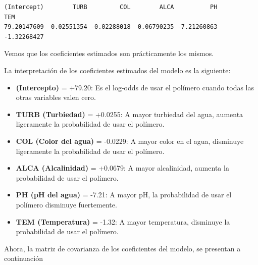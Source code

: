 \documentclass[
  letterpaper,
  DIV=11,
  numbers=noendperiod]{scrartcl}
\newenvironment{Shaded}{\begin{snugshade}}{\end{snugshade}}
\newcommand{\FunctionTok}[1]{\textcolor[rgb]{0.28,0.35,0.67}{#1}}
\newcommand{\NormalTok}[1]{\textcolor[rgb]{0.00,0.23,0.31}{#1}}
\newcommand{\SpecialCharTok}[1]{\textcolor[rgb]{0.37,0.37,0.37}{#1}}
\providecommand{\tightlist}{%
  \setlength{\itemsep}{0pt}\setlength{\parskip}{0pt}}\usepackage{longtable,booktabs,array}
\begin{document}
\begin{verbatim}
(Intercept)        TURB         COL        ALCA          PH         TEM 
79.20147609  0.02551354 -0.02288018  0.06790235 -7.21260863 -1.32268427 
\end{verbatim}

Vemos que los coeficientes estimados son prácticamente los mismos.

La interpretación de los coeficientes estimados del modelo es la
siguiente:

\begin{itemize}
\tightlist
\item
  \textbf{(Intercepto)} = +79.20: Es el log-odds de usar el polímero
  cuando todas las otras variables valen cero.
\item
  \textbf{TURB (Turbiedad)} = +0.0255: A mayor turbiedad del agua,
  aumenta ligeramente la probabilidad de usar el polímero.
\item
  \textbf{COL (Color del agua)} = -0.0229: A mayor color en el agua,
  disminuye ligeramente la probabilidad de usar el polímero.
\item
  \textbf{ALCA (Alcalinidad)} = +0.0679: A mayor alcalinidad, aumenta la
  probabilidad de usar el polímero.
\item
  \textbf{PH (pH del agua)} = -7.21: A mayor pH, la probabilidad de usar
  el polímero disminuye fuertemente.
\item
  \textbf{TEM (Temperatura)} = -1.32: A mayor temperatura, disminuye la
  probabilidad de usar el polímero.
\end{itemize}

Ahora, la matriz de covarianza de los coeficientes del modelo, se
presentan a continuación

\begin{Shaded}
\end{Shaded}
\end{document}
